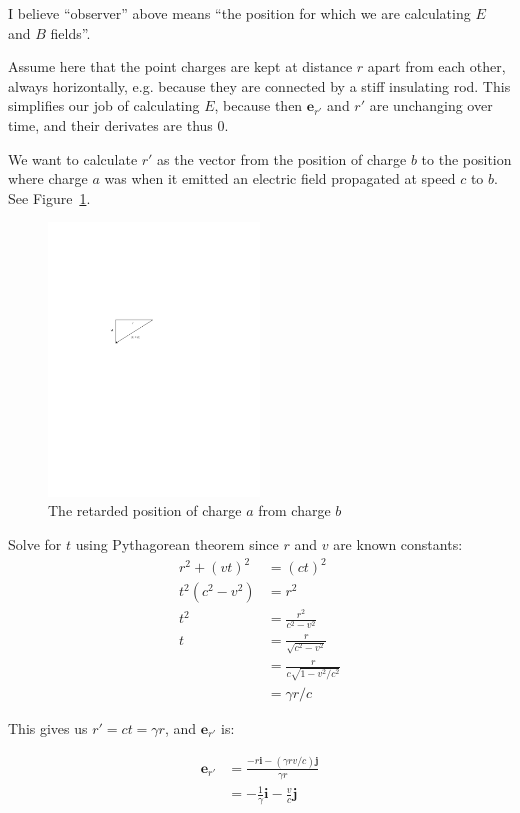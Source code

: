 \documentclass[a4paper]{article}
\theoremstyle{plain}
\theoremstyle{definition}
\newcommand{\ihat}{\mathbf{i}}
\newcommand{\jhat}{\mathbf{j}}
\newcommand{\vect}[1]{\mathbf{#1}}
\begin{document}
I believe ``observer'' above means ``the position for which we are
calculating $E$ and $B$ fields''.

Assume here that the point charges are kept at distance $r$ apart from
each other, always horizontally, e.g. because they are connected by a
stiff insulating rod.  This simplifies our job of calculating $E$,
because then $\vect{e}_{r'}$ and $r'$ are unchanging over time, and
their derivates are thus 0.

We want to calculate $r'$ as the vector from the position of charge
$b$ to the position where charge $a$ was when it emitted an electric
field propagated at speed $c$ to $b$.  See
Figure~\ref{fig:retarded-position}.

\begin{figure}[ht]
	\centering
	\includegraphics[width=0.5\textwidth]{retarded-position-cropped.pdf}
	\caption{The retarded position of charge $a$ from charge $b$}
	\label{fig:retarded-position}
\end{figure}

Solve for $t$ using Pythagorean theorem since $r$ and $v$ are known
constants:
\begin{align*}
r^2 + (vt)^2 & = (ct)^2 \\
t^2 (c^2 - v^2) & = r^2 \\
t^2 & = \frac{r^2}{c^2 - v^2} \\
t & = \frac{r}{\sqrt{c^2-v^2}} \\
  & = \frac{r}{c \sqrt{1 - v^2/c^2}} \\
  & = \gamma r / c
\end{align*}

This gives us $r' = ct = \gamma r$, and $\vect{e}_{r'}$ is:

\begin{align*}
\vect{e}_{r'} & = \frac{-r \ihat - (\gamma r v / c) \jhat}{\gamma r} \\
  & = - \frac{1}{\gamma} \ihat - \frac{v}{c} \jhat
\end{align*}
\end{document}
